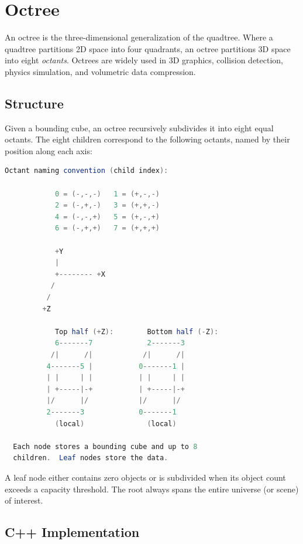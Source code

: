 
\section{Octree}

An octree is the three-dimensional generalization of the quadtree. Where a quadtree partitions 2D space into four quadrants, an octree partitions 3D space into eight \emph{octants}. Octrees are widely used in 3D graphics, collision detection, physics simulation, and volumetric data compression.

\subsection{Structure}

Given a bounding cube, an octree recursively subdivides it into eight equal octants. The eight children correspond to the following octants, named by their position along each axis:

\begin{center}
\begin{lstlisting}[language=Java]
            Octant naming convention (child index):

            0 = (-,-,-)   1 = (+,-,-)
            2 = (-,+,-)   3 = (+,+,-)
            4 = (-,-,+)   5 = (+,-,+)
            6 = (-,+,+)   7 = (+,+,+)

            +Y
            |
            +-------- +X
           /
          /
         +Z

            Top half (+Z):        Bottom half (-Z):
            6-------7             2-------3
           /|      /|            /|      /|
          4-------5 |           0-------1 |
          | |     | |           | |     | |
          | +-----|-+           | +-----|-+
          |/      |/            |/      |/
          2-------3             0-------1
            (local)               (local)

  Each node stores a bounding cube and up to 8
  children.  Leaf nodes store the data.
\end{lstlisting}
\end{center}

A leaf node either contains zero objects or is subdivided when its object count exceeds a capacity threshold. The root always spans the entire universe (or scene) of interest.

\subsection{C++ Implementation}

